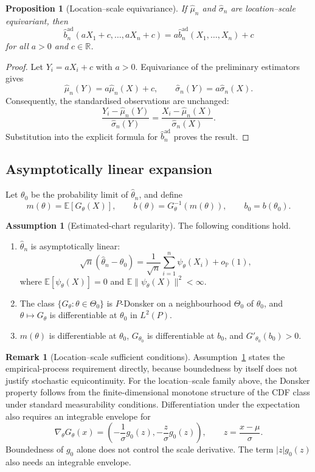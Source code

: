 \documentclass[11pt,a4paper]{article}
\newtheorem{proposition}[theorem]{Proposition}
\theoremstyle{definition}
\newtheorem{assumption}[theorem]{Assumption}
\newtheorem{remark}[theorem]{Remark}
\newcommand{\E}{\mathbb{E}}
\newcommand{\Prob}{\mathbb{P}}
\newcommand{\R}{\mathbb{R}}
\begin{document}
\begin{proposition}[Location--scale equivariance]\label{prop:adaptive-equivariance}
If $\widehat\mu_n$ and $\widehat\sigma_n$ are location--scale equivariant, then
\[
\widehat b_n^{\mathrm{ad}}(aX_1+c,\ldots,aX_n+c)
=
a\widehat b_n^{\mathrm{ad}}(X_1,\ldots,X_n)+c
\]
for all $a>0$ and $c\in\R$.
\end{proposition}

\begin{proof}
Let $Y_i=aX_i+c$ with $a>0$. Equivariance of the preliminary estimators gives
\[
\widehat\mu_n(Y)=a\widehat\mu_n(X)+c,
\qquad
\widehat\sigma_n(Y)=a\widehat\sigma_n(X).
\]
Consequently, the standardised observations are unchanged:
\[
\frac{Y_i-\widehat\mu_n(Y)}{\widehat\sigma_n(Y)}
=
\frac{X_i-\widehat\mu_n(X)}{\widehat\sigma_n(X)}.
\]
Substitution into the explicit formula for $\widehat b_n^{\mathrm{ad}}$ proves the result.
\end{proof}

\subsection{Asymptotically linear expansion}

Let $\theta_0$ be the probability limit of $\widehat\theta_n$, and define
\[
m(\theta)=\E[G_\theta(X)],
\qquad
b(\theta)=G_\theta^{-1}(m(\theta)),
\qquad
b_0=b(\theta_0).
\]

\begin{assumption}[Estimated-chart regularity]\label{ass:adaptive}
The following conditions hold.
\begin{enumerate}[label=(\roman*)]
\item $\widehat\theta_n$ is asymptotically linear:
\[
\sqrt n(\widehat\theta_n-\theta_0)
=
\frac1{\sqrt n}\sum_{i=1}^n\psi_\theta(X_i)+o_{\Prob}(1),
\]
where $\E[\psi_\theta(X)]=0$ and $\E\|\psi_\theta(X)\|^2<\infty$.
\item The class $\{G_\theta:\theta\in\Theta_0\}$ is $P$-Donsker on a neighbourhood $\Theta_0$ of $\theta_0$, and $\theta\mapsto G_\theta$ is differentiable at $\theta_0$ in $L^2(P)$.
\item $m(\theta)$ is differentiable at $\theta_0$, $G_{\theta_0}$ is differentiable at $b_0$, and $G'_{\theta_0}(b_0)>0$.
\end{enumerate}
\end{assumption}

\begin{remark}[Location--scale sufficient conditions]
Assumption~\ref{ass:adaptive} states the empirical-process requirement directly, because boundedness by itself does not justify stochastic equicontinuity. For the location--scale family above, the Donsker property follows from the finite-dimensional monotone structure of the CDF class under standard measurability conditions. Differentiation under the expectation also requires an integrable envelope for
\[
\nabla_\theta G_\theta(x)
=
\left(
-\frac1\sigma g_0(z),
-\frac z\sigma g_0(z)
\right),
\qquad z=\frac{x-\mu}{\sigma}.
\]
Boundedness of $g_0$ alone does not control the scale derivative. The term $|z|g_0(z)$ also needs an integrable envelope.
\end{remark}
\end{document}
